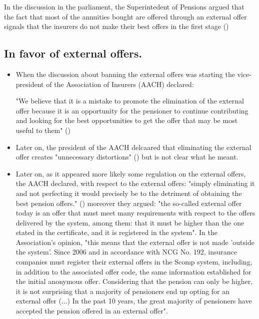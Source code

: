 \documentclass[12pt]{article}
\theoremstyle{plain}
\theoremstyle{plain}
\begin{document}
In the discussion in the parliament, the Superintedent of Pensions argued that the fact that most of the annuities bought are offered through an external offer signals that the insurers do not make their best offers in the first stage (\cite[p.~36]{comision_trabajo_y_seguridad_social_informe_2025})

\subsection{In favor of external offers. }

\begin{itemize}
    \item When the discussion about banning the external offers was starting the vice-president of the Association of Insurers (AACH) declared: 

    "We believe that it is a mistake to promote the elimination of the external offer because it is an opportunity for the pensioner to continue contributing and looking for the best opportunities to get the offer that may be most useful to them" (\textcite{diario_financiero_aseguradores_2017})

    \item Later on, the president of the AACH delcaared that eliminating the external offer creates "unnecessary distortions" (\cite{diario_financiero_aseguradores_2018}) but is not clear what he meant.

    \item Later on, as it appeared more likely some regulation on the external offers, the AACH declared, with respect to the external offers: "simply eliminating it and not perfecting it would precisely be to the detriment of obtaining the best pension offers." (\cite{la_tercera_reforma_2024})  moreover they argued:  "the so-called external offer today is an offer that must meet many requirements with respect to the offers delivered by the system, among them: that it must be higher than the one stated in the certificate, and it is registered in the system". In the Association's opinion, "this means that the external offer is not made 'outside the system'. Since 2006 and in accordance with NCG No. 192, insurance companies must register their external offers in the Scomp system, including, in addition to the associated offer code, the same information established for the initial anonymous offer. Considering that the pension can only be higher, it is not surprising that a majority of pensioners end up opting for an external offer (...) In the past 10 years, the great majority of pensioners have accepted the pension offered in an external offer".


\end{itemize}
\end{document}
